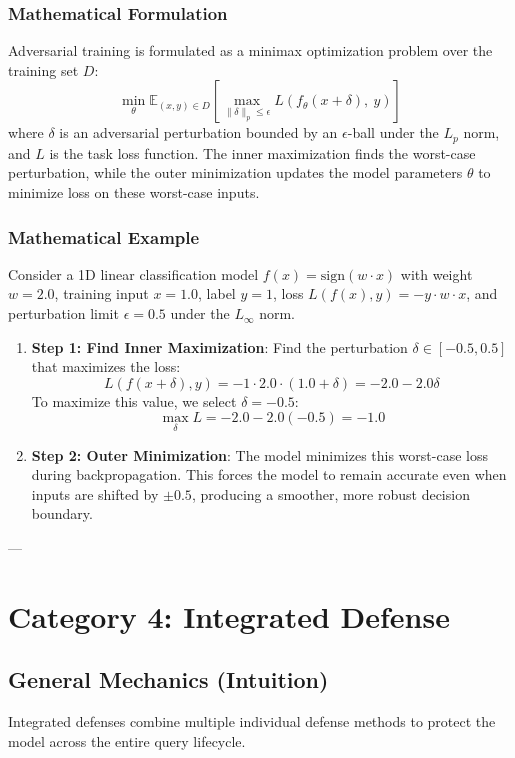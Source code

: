\documentclass{article}
\begin{document}
\subsubsection{Mathematical Formulation}
Adversarial training is formulated as a minimax optimization problem over the training set $D$:
\begin{equation}
    \min_\theta \mathbb{E}_{(x,y) \in D} \left[ \max_{\|\delta\|_p \le \epsilon} L\left( f_\theta(x + \delta), \ y \right) \right]
\end{equation}
where $\delta$ is an adversarial perturbation bounded by an $\epsilon$-ball under the $L_p$ norm, and $L$ is the task loss function. The inner maximization finds the worst-case perturbation, while the outer minimization updates the model parameters $\theta$ to minimize loss on these worst-case inputs.

\subsubsection{Mathematical Example}
Consider a 1D linear classification model $f(x) = \text{sign}(w \cdot x)$ with weight $w = 2.0$, training input $x = 1.0$, label $y = 1$, loss $L(f(x), y) = -y \cdot w \cdot x$, and perturbation limit $\epsilon = 0.5$ under the $L_\infty$ norm.
\begin{enumerate}
    \item \textbf{Step 1: Find Inner Maximization}: Find the perturbation $\delta \in [-0.5, 0.5]$ that maximizes the loss:
    $$L(f(x+\delta), y) = -1 \cdot 2.0 \cdot (1.0 + \delta) = -2.0 - 2.0 \delta$$
    To maximize this value, we select $\delta = -0.5$:
    $$\max_\delta L = -2.0 - 2.0(-0.5) = -1.0$$
    
    \item \textbf{Step 2: Outer Minimization}: The model minimizes this worst-case loss during backpropagation. This forces the model to remain accurate even when inputs are shifted by $\pm 0.5$, producing a smoother, more robust decision boundary.
\end{enumerate}

---

\section{Category 4: Integrated Defense}

\subsection{General Mechanics (Intuition)}
Integrated defenses combine multiple individual defense methods to protect the model across the entire query lifecycle. 
\end{document}
